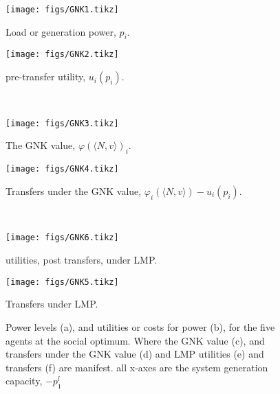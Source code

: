     \begin{figure}[]
	\centering
    \begin{minipage}[t]{.48\linewidth}
        \centering
        \texttt{[image: figs/GNK1.tikz]}
        \caption{\centering Load or generation power, $p_i$.}\label{fig:1a}
    \end{minipage}
    \begin{minipage}[t]{.48\linewidth}
        \centering
        \texttt{[image: figs/GNK2.tikz]}
        \caption{\centering pre-transfer utility, $u_i(p_i)$.}\label{fig:1b}
    \end{minipage}\\
    \vspace{5mm}
    \begin{minipage}[t]{.48\linewidth}
        \centering
        \texttt{[image: figs/GNK3.tikz]}
        \caption{\centering The GNK value, $\varphi(\langle N,v \rangle)_i$.}\label{fig:1c}
    \end{minipage}
    \begin{minipage}[t]{.48\linewidth}
        \centering
        \texttt{[image: figs/GNK4.tikz]}
        \caption{\centering Transfers under the GNK value, $\varphi_i(\langle N,v \rangle)-u_i(p_i)$.}\label{fig:1e}
    \end{minipage}\\
    \vspace{5mm}
    \begin{minipage}[t]{.48\linewidth}
        \centering
        \texttt{[image: figs/GNK6.tikz]}
        \caption{\centering utilities, post transfers, under LMP.}\label{fig:1f}
    \end{minipage}
    \begin{minipage}[t]{.48\linewidth}
        \centering
        \texttt{[image: figs/GNK5.tikz]}
        \caption{\centering Transfers under LMP.}\label{fig:1d}
    \end{minipage}
    \vspace{0.3\baselineskip}
    \caption{Power levels (a), and utilities or costs for power (b), for the five agents at the social optimum. Where the GNK value (c), and transfers under the GNK value (d) and LMP utilities (e) and transfers (f) are manifest. all x-axes are the system generation capacity, $-p_1^l$}\label{fig:1}
\end{figure}